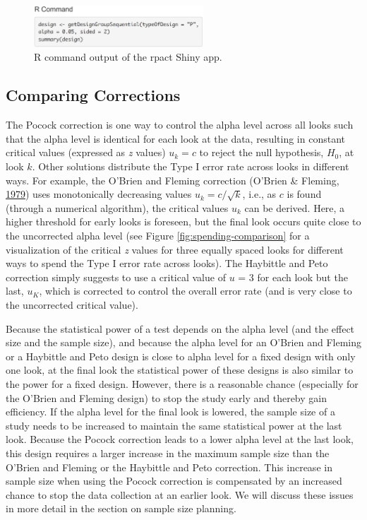\documentclass[
  english,
  ,jou, a4paper,floatsintext]{apa6}
\begin{document}
\begin{figure}
\includegraphics[width=240px]{seq_images/output_2} \caption{R command output of the rpact Shiny app.}\label{fig:output-2}
\end{figure}

\hypertarget{comparing-corrections}{%
\subsection{Comparing Corrections}\label{comparing-corrections}}

The Pocock correction is one way to control the alpha level across all looks such that the alpha level is identical for each look at the data, resulting in constant critical values (expressed as \emph{z} values) \(u_k = c\) to reject the null hypothesis, \(H_0\), at look \(k\). Other solutions distribute the Type I error rate across looks in different ways. For example, the O'Brien and Fleming correction (O'Brien \& Fleming, \protect\hyperlink{ref-obrien_multiple_1979}{1979}) uses monotonically decreasing values \(u_k = c/\sqrt{k}\), i.e., as \(c\) is found (through a numerical algorithm), the critical values \(u_k\) can be derived. Here, a higher threshold for early looks is foreseen, but the final look occurs quite close to the uncorrected alpha level (see Figure \ref{fig:spending-comparison} for a visualization of the critical \emph{z} values for three equally spaced looks for different ways to spend the Type I error rate across looks). The Haybittle and Peto correction simply suggests to use a critical value of \(u\) = 3 for each look but the last, \(u_K\), which is corrected to control the overall error rate (and is very close to the uncorrected critical value).

Because the statistical power of a test depends on the alpha level (and the effect size and the sample size), and because the alpha level for an O'Brien and Fleming or a Haybittle and Peto design is close to alpha level for a fixed design with only one look, at the final look the statistical power of these designs is also similar to the power for a fixed design. However, there is a reasonable chance (especially for the O'Brien and Fleming design) to stop the study early and thereby gain efficiency. If the alpha level for the final look is lowered, the sample size of a study needs to be increased to maintain the same statistical power at the last look. Because the Pocock correction leads to a lower alpha level at the last look, this design requires a larger increase in the maximum sample size than the O'Brien and Fleming or the Haybittle and Peto correction. This increase in sample size when using the Pocock correction is compensated by an increased chance to stop the data collection at an earlier look. We will discuss these issues in more detail in the section on sample size planning.
\end{document}

